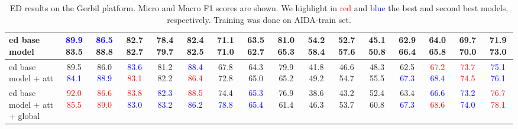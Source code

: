 \documentclass[11pt,a4paper]{article}
\newcommand{\redc}[1] {\textcolor{red}{#1}}
\newcommand{\bluec}[1] {\textcolor{blue}{#1}}
\begin{document}
\begin{table*}[!h]
\begin{adjustwidth}{-1cm}{}
\begin{tabular}{@{} l|c| c| c| c| c| c| c| c| c| c| c| c| c| c| c| @{}}
\hline
ed base model& \multicolumn{1}{p{0.6cm}|}{\bluec{89.9} 83.5}& \multicolumn{1}{p{0.6cm}|}{\bluec{86.5} 88.8}& \multicolumn{1}{p{0.6cm}|}{82.7 82.7}& \multicolumn{1}{p{0.6cm}|}{78.4 79.7}& \multicolumn{1}{p{0.6cm}|}{82.4 82.5}& \multicolumn{1}{p{0.6cm}|}{71.1 71.0}& \multicolumn{1}{p{0.6cm}|}{63.5 62.7}& \multicolumn{1}{p{0.6cm}|}{81.0 65.3}& \multicolumn{1}{p{0.6cm}|}{54.2 58.4}& \multicolumn{1}{p{0.6cm}|}{52.7 57.6}& \multicolumn{1}{p{0.6cm}|}{45.1 50.8}& \multicolumn{1}{p{0.6cm}|}{62.9 66.4}& \multicolumn{1}{p{0.6cm}|}{64.0 65.8}& \multicolumn{1}{p{0.6cm}|}{69.7 70.0}& \multicolumn{1}{p{0.6cm}|}{71.9 73.0}\\
\hline
ed base model + att& \multicolumn{1}{p{0.6cm}|}{89.5 \bluec{84.1}}& \multicolumn{1}{p{0.6cm}|}{86.0 \bluec{88.9}}& \multicolumn{1}{p{0.6cm}|}{\bluec{83.6} \redc{83.1}}& \multicolumn{1}{p{0.6cm}|}{81.2 82.2}& \multicolumn{1}{p{0.6cm}|}{\bluec{88.4} \redc{86.4}}& \multicolumn{1}{p{0.6cm}|}{67.8 72.8}& \multicolumn{1}{p{0.6cm}|}{64.3 65.0}& \multicolumn{1}{p{0.6cm}|}{79.9 65.2}& \multicolumn{1}{p{0.6cm}|}{41.8 49.2}& \multicolumn{1}{p{0.6cm}|}{46.6 54.7}& \multicolumn{1}{p{0.6cm}|}{48.3 55.5}& \multicolumn{1}{p{0.6cm}|}{62.5 \bluec{67.3}}& \multicolumn{1}{p{0.6cm}|}{\redc{67.2} \bluec{68.4}}& \multicolumn{1}{p{0.6cm}|}{\redc{73.7 74.5}}& \multicolumn{1}{p{0.6cm}|}{\bluec{75.1 76.1}}\\
\hline
ed base model + att + global& \multicolumn{1}{p{0.6cm}|}{\redc{92.0 85.5}}& \multicolumn{1}{p{0.6cm}|}{\redc{86.6 89.0}}& \multicolumn{1}{p{0.6cm}|}{\redc{83.8} \bluec{83.0}}& \multicolumn{1}{p{0.6cm}|}{\bluec{82.3 83.2}}& \multicolumn{1}{p{0.6cm}|}{\redc{88.5} \bluec{86.2}}& \multicolumn{1}{p{0.6cm}|}{74.4 \bluec{78.8}}& \multicolumn{1}{p{0.6cm}|}{\bluec{65.3 65.4}}& \multicolumn{1}{p{0.6cm}|}{76.9 61.4}& \multicolumn{1}{p{0.6cm}|}{38.6 46.3}& \multicolumn{1}{p{0.6cm}|}{43.2 53.7}& \multicolumn{1}{p{0.6cm}|}{52.4 60.8}& \multicolumn{1}{p{0.6cm}|}{63.4 \bluec{67.3}}& \multicolumn{1}{p{0.6cm}|}{\bluec{66.6} \redc{68.6}}& \multicolumn{1}{p{0.6cm}|}{\bluec{73.2 74.0}}& \multicolumn{1}{p{0.6cm}|}{\redc{76.7 78.1}}\\
\hline
\end{tabular}
\caption{ED results on the Gerbil platform. Micro and Macro F1 scores are shown. We highlight in \redc{red} and \bluec{blue} the best and second best models, respectively. Training was done on AIDA-train set.}
\label{tab:ed}
\end{adjustwidth}
\end{table*}
\end{document}
